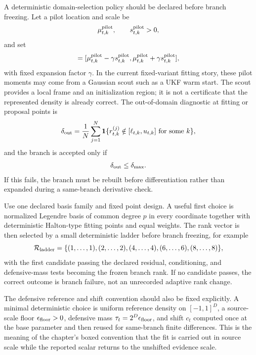A deterministic domain-selection policy should be declared before branch
freezing.  Let a pilot location and scale be
\begin{equation}
  \mu_{t,k}^{\rm pilot},
  \qquad
  s_{t,k}^{\rm pilot}>0,
  \label{eq:bf-hd-squared-tt-pilot-domain}
\end{equation}
and set
\begin{equation}
  [\ell_{t,k},u_{t,k}]
  =
  [\mu_{t,k}^{\rm pilot}-\gamma s_{t,k}^{\rm pilot},
   \mu_{t,k}^{\rm pilot}+\gamma s_{t,k}^{\rm pilot}],
  \label{eq:bf-hd-squared-tt-domain-policy}
\end{equation}
with fixed expansion factor \(\gamma\).  In the current fixed-variant fitting
story, these pilot moments may come from a Gaussian scout such as a UKF warm
start.  The scout provides a local frame and an initialization region; it is not
a certificate that the represented density is already correct.  The
out-of-domain diagnostic at fitting or proposal points is
\begin{equation}
  \delta_{\rm out}=
  \frac1N\sum_{j=1}^N \mathbf{1}\{r_{t,k}^{(j)}\notin[\ell_{t,k},u_{t,k}]\ \text{for some }k\},
  \label{eq:bf-hd-squared-tt-domain-diagnostic}
\end{equation}
and the branch is accepted only if
\begin{equation}
  \delta_{\rm out}\le\delta_{\max}.
  \label{eq:bf-hd-squared-tt-domain-accept}
\end{equation}
If this fails, the branch must be rebuilt before differentiation rather than
expanded during a same-branch derivative check.

Use one declared basis family and fixed point design.  A useful first choice is
normalized Legendre basis of common degree \(p\) in every coordinate together
with deterministic Halton-type fitting points and equal weights.  The rank vector
is then selected by a small deterministic ladder before branch freezing, for
example
\begin{equation}
  \mathcal R_{\rm ladder}=
  \{(1,\ldots,1),(2,\ldots,2),(4,\ldots,4),(6,\ldots,6),(8,\ldots,8)\},
  \label{eq:bf-hd-squared-tt-rank-ladder}
\end{equation}
with the first candidate passing the declared residual, conditioning, and
defensive-mass tests becoming the frozen branch rank.  If no candidate passes,
the correct outcome is branch failure, not an unrecorded adaptive rank change.

The defensive reference and shift convention should also be fixed explicitly.  A
minimal deterministic choice is uniform reference density on \([-1,1]^D\), a
source-scale floor \(\epsilon_{\rm floor}>0\), defensive mass
\(\tau_t=2^D\epsilon_{\rm floor}\), and shift \(c_t\) computed once at the base
parameter and then reused for same-branch finite differences.  This is the
meaning of the chapter's boxed convention that the fit is carried out in source
scale while the reported scalar returns to the unshifted evidence scale.

